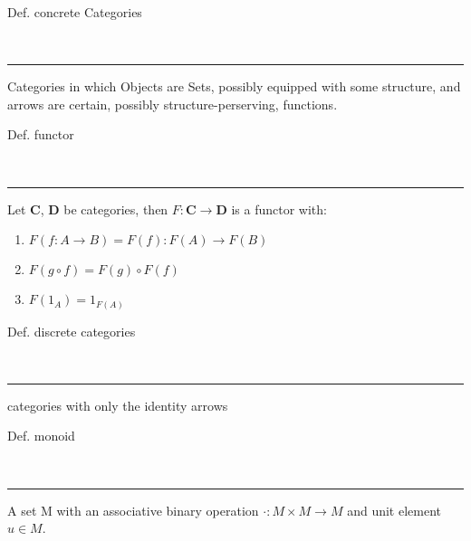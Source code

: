 \begin{note}
  \begin{field}
    Def. concrete Categories
  \end{field} \\
  \noindent\rule[0.5ex]{\linewidth}{1pt}
  \begin{field}
    Categories in which Objects are Sets, possibly equipped with some structure, and arrows are certain, possibly structure-perserving, functions.
  \end{field}
\end{note}

\begin{note}
  \begin{field}
    Def. functor
  \end{field} \\
  \noindent\rule[0.5ex]{\linewidth}{1pt}
  \begin{field}
    Let \textbf{C}, \textbf{D} be categories, then $F: \textbf{C} \rightarrow \textbf{D}$ is a functor with:\\
    \begin{enumerate}
      \item $F(f: A \rightarrow B) = F(f): F(A) \rightarrow F(B)$
      \item $F(g\circ f) = F(g)\circ F(f)$
      \item $F(1_A) = 1_{F(A)}$
    \end{enumerate}
  \end{field}
\end{note}

\begin{note}
  \begin{field}
    Def. discrete categories
  \end{field} \\
  \noindent\rule[0.5ex]{\linewidth}{1pt}
  \begin{field}
    categories with only the identity arrows
  \end{field}
\end{note}

\begin{note}
  \begin{field}
    Def. monoid
  \end{field} \\
  \noindent\rule[0.5ex]{\linewidth}{1pt}
  \begin{field}
    A set M with an associative binary operation $\cdot: M\times M \rightarrow M$ and unit element $u\in M$.
  \end{field}
\end{note}

